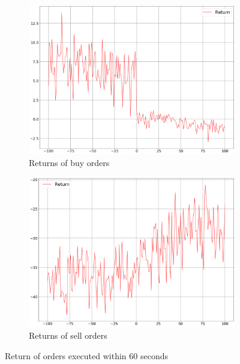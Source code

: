 \begin{figure}[H]
    \centering
    \begin{subfigure}[b]{0.45\textwidth}
        \includegraphics[width=\textwidth]{images/behaviour-60s-buy.png}
        \caption{Returns of buy orders}
        \label{fig:behvaiour-60s-buy}
    \end{subfigure}
    \begin{subfigure}[b]{0.45\textwidth}
        \includegraphics[width=\textwidth]{images/behaviour-60s-sell.png}
        \caption{Returns of sell orders}
        \label{fig:behvaiour-60s-sell}
    \end{subfigure}
    \caption{Return of orders executed within 60 seconds}
\end{figure}

